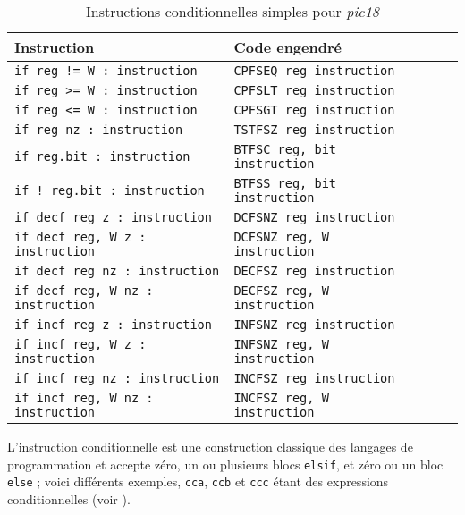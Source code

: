 \begin{table}[!ht]
  \centering
  \small
  \begin{tabular}{lp{4cm}lll}
    \textbf{Instruction} & \textbf{Code engendré}\\
    \hline
    \texttt{if reg != W : instruction} & \texttt{CPFSEQ reg instruction} \\
    \texttt{if reg >= W : instruction} & \texttt{CPFSLT reg instruction} \\
    \texttt{if reg <= W : instruction} & \texttt{CPFSGT reg instruction} \\
    \texttt{if reg nz : instruction} & \texttt{TSTFSZ reg instruction} \\
    \texttt{if reg.bit : instruction} & \texttt{BTFSC reg, bit instruction} \\
    \texttt{if ! reg.bit : instruction} & \texttt{BTFSS reg, bit instruction} \\
    \texttt{if decf reg z : instruction} & \texttt{DCFSNZ reg instruction} \\
    \texttt{if decf reg, W z : instruction} & \texttt{DCFSNZ reg, W instruction} \\
    \texttt{if decf reg nz : instruction} & \texttt{DECFSZ reg instruction} \\
    \texttt{if decf reg, W nz : instruction} & \texttt{DECFSZ reg, W instruction} \\
    \texttt{if incf reg z : instruction} & \texttt{INFSNZ reg instruction} \\
    \texttt{if incf reg, W z : instruction} & \texttt{INFSNZ reg, W instruction} \\
    \texttt{if incf reg nz : instruction} & \texttt{INCFSZ reg instruction} \\
    \texttt{if incf reg, W nz : instruction} & \texttt{INCFSZ reg, W instruction} \\
    \hline
  \end{tabular}
  \caption{Instructions conditionnelles simples pour \emph{pic18}}
\end{table}





L'instruction conditionnelle est une construction classique des langages de programmation et accepte zéro, un ou plusieurs blocs \texttt{elsif}, et zéro ou un bloc \texttt{else} ; voici différents exemples, \texttt{cca}, \texttt{ccb} et \texttt{ccc} étant des expressions conditionnelles (voir ).


